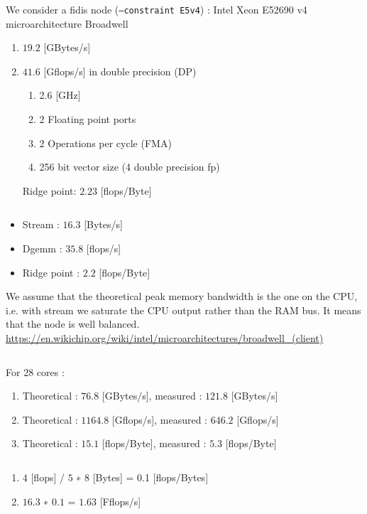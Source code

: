\documentclass[11pt,a4paper]{article}
\begin{document}

\noindent

\begin{exercise}
  $~$ %

We consider a fidis node (\texttt{--constraint E5v4}) : Intel Xeon E52690 v4 microarchitecture Broadwell

\begin{enumerate}
\item $19.2$ [GBytes/s]
\item {$41.6$ [Gflops/s] in double precision (DP)
	\begin{enumerate}[label=(\alph*)]
		\item 2.6 [GHz]	
		\item 2 Floating point ports
		\item 2 Operations per cycle (FMA)
		\item 256 bit vector size (4 double precision fp)
	\end{enumerate}
Ridge point: $2.23 $ [flops/Byte]
}
\end{enumerate}
\end{exercise}


\begin{exercise}
  $~$ %

\begin{itemize}
\item Stream : $16.3$ [Bytes/s]
\item Dgemm : $35.8$ [flops/s]
\item Ridge point : $2.2$ [flops/Byte]
\end{itemize}

We assume that the theoretical peak memory bandwidth is the one on the CPU, i.e. with stream we saturate the CPU output rather than the RAM bus. It means that the node is well balanced.  
\\

\url{https://en.wikichip.org/wiki/intel/microarchitectures/broadwell_(client)}

\end{exercise}

\begin{exercise}
  $~$ %

For 28 cores : 

\begin{enumerate}
\item Theoretical : $76.8$ [GBytes/s], measured : $121.8$ [GBytes/s]
\item Theoretical : $1164.8$ [Gflops/s], measured : $646.2$ [Gflops/s]
\item Theoretical : $15.1$ [flops/Byte], measured : $5.3$ [flops/Byte]
\end{enumerate}


\end{exercise}


\begin{exercise}
  $~$ %

\begin{enumerate}
\item $4$ [flops] / $5$ ∗ 8 [Bytes] = 0.1 [flops/Bytes]
\item $16.3$ ∗ $0.1$ = $1.63$ [Fflops/s]
\end{enumerate}

\end{exercise}
\end{document}
